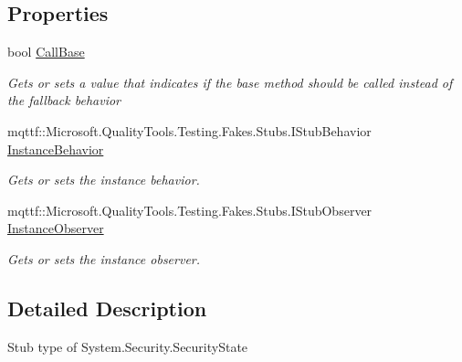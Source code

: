 \subsection*{Properties}
\begin{DoxyCompactItemize}
\item 
bool \hyperlink{class_system_1_1_security_1_1_fakes_1_1_stub_security_state_a4d0ff3ba111c65a382f0f57c93140770}{Call\-Base}
\begin{DoxyCompactList}\small\item\em Gets or sets a value that indicates if the base method should be called instead of the fallback behavior\end{DoxyCompactList}\item 
mqttf\-::\-Microsoft.\-Quality\-Tools.\-Testing.\-Fakes.\-Stubs.\-I\-Stub\-Behavior \hyperlink{class_system_1_1_security_1_1_fakes_1_1_stub_security_state_a1a3177982d216be7cc69879b50554b8f}{Instance\-Behavior}
\begin{DoxyCompactList}\small\item\em Gets or sets the instance behavior.\end{DoxyCompactList}\item 
mqttf\-::\-Microsoft.\-Quality\-Tools.\-Testing.\-Fakes.\-Stubs.\-I\-Stub\-Observer \hyperlink{class_system_1_1_security_1_1_fakes_1_1_stub_security_state_ae4212dd10e051b2daf819cddd96fcc74}{Instance\-Observer}
\begin{DoxyCompactList}\small\item\em Gets or sets the instance observer.\end{DoxyCompactList}\end{DoxyCompactItemize}


\subsection{Detailed Description}
Stub type of System.\-Security.\-Security\-State



